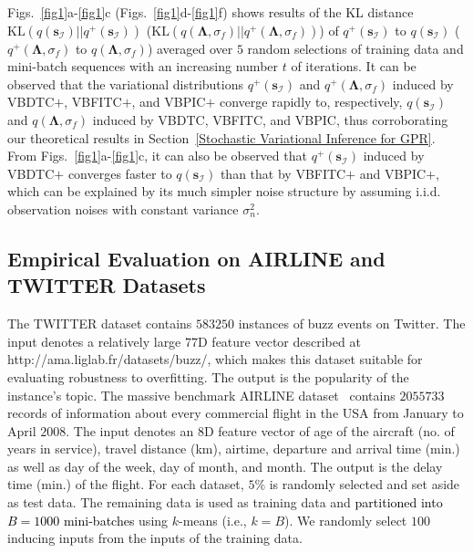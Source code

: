 \documentclass[conference]{IEEEtran}
\begin{document}
		Figs.~\ref{fig1}a-\ref{fig1}c (Figs.~\ref{fig1}d-\ref{fig1}f) shows results of the KL distance $\mathrm{KL}(q(\mathbf{s}_\mathcal{I})||q^+(\mathbf{s}_\mathcal{I}))$ ($\mathrm{KL}(q(\mathbf{\Lambda},\sigma_f)||q^+(\mathbf{\Lambda},\sigma_f))$) of $q^+(\mathbf{s}_\mathcal{I})$ to $q(\mathbf{s}_\mathcal{I})$ ($q^+(\mathbf{\Lambda},\sigma_f)$ to $q(\mathbf{\Lambda},\sigma_f)$) averaged over $5$ random selections of training data and mini-batch sequences with an increasing number $t$ of iterations. It can be observed that the variational distributions $q^+(\mathbf{s}_\mathcal{I})$ and $q^+(\mathbf{\Lambda},\sigma_f)$ induced by VBDTC$+$, VBFITC$+$, and VBPIC$+$ converge rapidly to, respectively, $q(\mathbf{s}_\mathcal{I})$ and $q(\mathbf{\Lambda},\sigma_f)$ induced by VBDTC, VBFITC, and VBPIC, thus corroborating our theoretical results in Section~\ref{Stochastic Variational Inference for GPR}. From Figs.~\ref{fig1}a-\ref{fig1}c, it can also be observed that $q^+(\mathbf{s}_\mathcal{I})$ induced by  VBDTC$+$ converges faster to $q(\mathbf{s}_\mathcal{I})$ than that by VBFITC$+$ and VBPIC$+$, which can be explained by its much simpler noise structure by assuming i.i.d. observation noises with constant variance $ \sigma_n^2 $.%
%
\subsection{Empirical Evaluation on AIRLINE and TWITTER Datasets}%
The TWITTER dataset 
contains $583250$ instances of buzz events on Twitter.  The input denotes a relatively large $77$D feature vector described at 
http://ama.liglab.fr/datasets/buzz/, which makes this dataset suitable for evaluating  robustness to overfitting.
The output is the popularity of the instance's topic. 		
%
The massive benchmark AIRLINE dataset~\cite{Lawrence13} contains $2055733$ records of information about every commercial flight in the USA from January to April $2008$. The input denotes an $8$D feature vector of age of the aircraft (no. of years in service), travel distance (km), airtime, departure and arrival time (min.) as well as day of the week, day of month, and month. The output is the delay time (min.) of the flight. 
For each dataset, $5\%$ is randomly selected and set aside as test data. The remaining data is used as training data and \textcolor{black}{partitioned into $B=1000$ mini-batches} using $k$-means (i.e., $k = B$). We randomly select $100$ inducing inputs from the inputs of the training data. 
\end{document}
